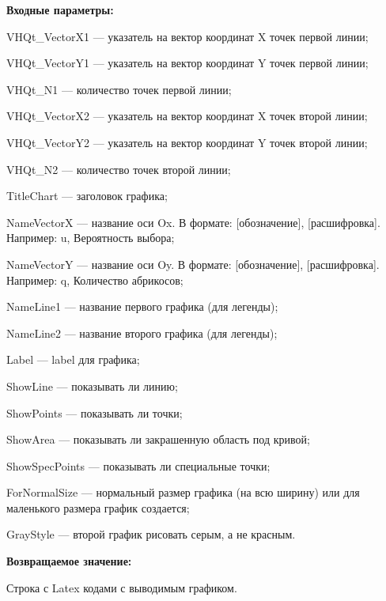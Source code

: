 \textbf{Входные параметры:}
 
    VHQt\_VectorX1 --- указатель на вектор координат X точек первой линии;
 
    VHQt\_VectorY1 --- указатель на вектор координат Y точек первой линии;
 
    VHQt\_N1 --- количество точек первой линии;
 
    VHQt\_VectorX2 --- указатель на вектор координат X точек второй линии;
 
    VHQt\_VectorY2 --- указатель на вектор координат Y точек второй линии;
 
    VHQt\_N2 --- количество точек второй линии;
 
    TitleChart --- заголовок графика;
 
    NameVectorX --- название оси Ox. В формате: [обозначение], [расшифровка]. Например: u, Вероятность выбора;
 
    NameVectorY --- название оси Oy. В формате: [обозначение], [расшифровка]. Например: q, Количество абрикосов;
 
    NameLine1 --- название первого графика (для легенды);
 
    NameLine2 --- название второго графика (для легенды);
 
    Label --- label для графика;
 
    ShowLine --- показывать ли линию;
 
    ShowPoints --- показывать ли точки;
 
    ShowArea --- показывать ли закрашенную область под кривой;
 
    ShowSpecPoints --- показывать ли специальные точки;
 
    ForNormalSize --- нормальный размер графика (на всю ширину) или для маленького размера график создается;
 
    GrayStyle --- второй график рисовать серым, а не красным.
	
\textbf{Возвращаемое значение:}

Строка с Latex кодами с выводимым графиком.